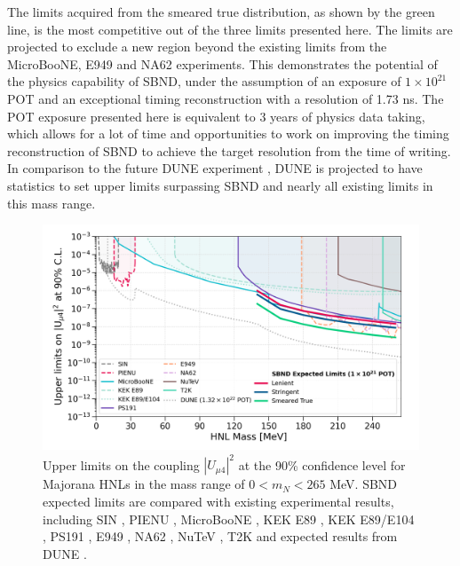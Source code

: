 The limits acquired from the smeared true distribution, as shown by the green line, is the most competitive out of the three limits presented here.
The limits are projected to exclude a new region beyond the existing limits from the MicroBooNE, E949 and NA62 experiments.
This demonstrates the potential of the physics capability of SBND, under the assumption of an exposure of $1 \times 10^{21}$ POT and an exceptional timing reconstruction with a resolution of 1.73 ns.
The POT exposure presented here is equivalent to 3 years of physics data taking, which allows for a lot of time and opportunities to work on improving the timing reconstruction of SBND to achieve the target resolution from the time of writing.
In comparison to the future DUNE experiment \cite{HNLSilvia}, DUNE is projected to have statistics to set upper limits surpassing SBND and nearly all existing limits in this mass range.

\begin{figure}[hb!]
    \centering
    \includegraphics[width=\textwidth]{sensitivity}
    \caption[Comparison Between SBND Expected Limits and Existing Limits]{
Upper limits on the coupling $|U_{\mu4}|^{2}$ at the 90\% confidence level for Majorana HNLs in the mass range of $0 < m_{N} < 265$ MeV.
SBND expected limits are compared with existing experimental results, including SIN \cite{SIN3}, PIENU \cite{PIENU}, MicroBooNE \cite{uboone1, uboone2, uboone3}, KEK E89 \cite{KEK2}, KEK E89/E104 \cite{KEK3}, PS191 \cite{PS191C}, E949 \cite{E949}, NA62 \cite{NA62B}, NuTeV \cite{NuTeV}, T2K \cite{t2k} and expected results from DUNE \cite{HNLSilvia}.
}
\label{fig:sensitivity}
\end{figure}

